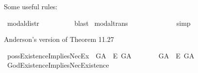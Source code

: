 \begin{isabellebody}
%
\endisatagproof
{\isafoldproof}%
%
\isadelimproof
%
\endisadelimproof
%
\begin{isamarkuptext}%
Some useful rules:%
\end{isamarkuptext}\isamarkuptrue%
\isamarkupfalse%
\ modal{\isacharunderscore}distr{\isacharcolon}\ {\isachardoublequoteopen}{\isasymlfloor}\isactrlbold {\isasymbox}{\isacharparenleft}{\isasymphi}\ \isactrlbold {\isasymrightarrow}\ {\isasympsi}{\isacharparenright}{\isasymrfloor}\ {\isasymLongrightarrow}\ {\isasymlfloor}{\isacharparenleft}\isactrlbold {\isasymdiamond}{\isasymphi}\ \isactrlbold {\isasymrightarrow}\ \isactrlbold {\isasymdiamond}{\isasympsi}{\isacharparenright}{\isasymrfloor}{\isachardoublequoteclose}%
\isadelimproof
\ %
\endisadelimproof
%
\isatagproof
{}\isamarkupfalse%
\ blast%
\endisatagproof
{\isafoldproof}%
%
\isadelimproof
%
\endisadelimproof
\isanewline
{}\isamarkupfalse%
\ modal{\isacharunderscore}trans{\isacharcolon}\ {\isachardoublequoteopen}{\isacharparenleft}{\isasymlfloor}{\isasymphi}\ \isactrlbold {\isasymrightarrow}\ {\isasympsi}{\isasymrfloor}\ {\isasymand}\ {\isasymlfloor}{\isasympsi}\ \isactrlbold {\isasymrightarrow}\ {\isasymchi}{\isasymrfloor}{\isacharparenright}\ {\isasymLongrightarrow}\ {\isasymlfloor}{\isasymphi}\ \isactrlbold {\isasymrightarrow}\ {\isasymchi}{\isasymrfloor}{\isachardoublequoteclose}%
\isadelimproof
\ %
\endisadelimproof
%
\isatagproof
{}\isamarkupfalse%
\ simp%
\endisatagproof
{\isafoldproof}%
%
\isadelimproof
%
\endisadelimproof
%
\begin{isamarkuptext}%
Anderson's version of Theorem 11.27%
\end{isamarkuptext}\isamarkuptrue%
\isamarkupfalse%
\ possExistenceImpliesNecEx{\isacharcolon}\ {\isachardoublequoteopen}{\isasymlfloor}\isactrlbold {\isasymdiamond}\isactrlbold {\isasymexists}\ G\isactrlsup A\ \isactrlbold {\isasymrightarrow}\ \isactrlbold {\isasymbox}\isactrlbold {\isasymexists}\isactrlsup E\ G\isactrlsup A{\isasymrfloor}{\isachardoublequoteclose}\ %
\isanewline
%
\isadelimproof
%
\endisadelimproof
%
\isatagproof
{}\isamarkupfalse%
\ {\isacharminus}\isanewline
\ \ \isamarkupfalse%
\ {\isachardoublequoteopen}{\isasymlfloor}\isactrlbold {\isasymexists}\ G\isactrlsup A\ \isactrlbold {\isasymrightarrow}\ \isactrlbold {\isasymbox}\isactrlbold {\isasymexists}\isactrlsup E\ G\isactrlsup A{\isasymrfloor}{\isachardoublequoteclose}\ \isamarkupfalse%
\ GodExistenceImpliesNecExistence\ \isanewline

\end{isabellebody}
